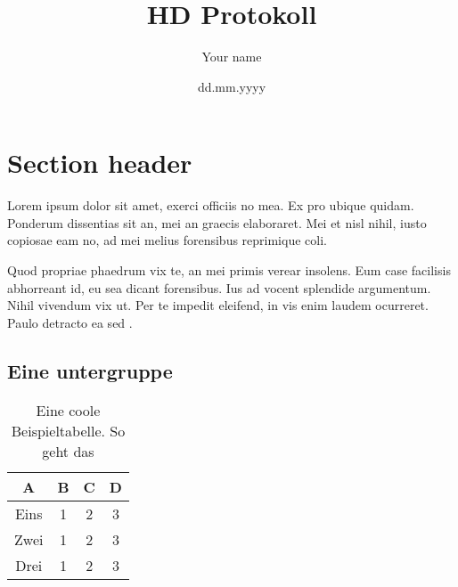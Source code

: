 \documentclass[%
 12pt,           %
 english,        %
 a4paper,        %
 DIV14,          %
 twoside,        %
 thesis,         %
 impberklaerung, %
]{hdprotokoll}
\title{HD Protokoll}
\author{Your name}
\date{dd.mm.yyyy}
\institute{free text}
\begin{document}
\maketitle                       %
\cleardoublepage                 %

\tableofcontents                 %

\newpage        			     %
\printglossaries                 %

\cleardoublepage                 %


\section{Section header}
Lorem ipsum dolor sit amet, exerci officiis no mea. Ex pro ubique quidam. Ponderum dissentias sit an, mei an graecis elaboraret. Mei et nisl nihil, iusto copiosae eam no, ad mei melius forensibus reprimique \gls{coli}.

Quod propriae phaedrum vix te, an mei primis verear insolens. Eum case facilisis abhorreant id, eu sea dicant forensibus. Ius ad vocent splendide argumentum. Nihil vivendum vix ut. Per te impedit eleifend, in vis enim laudem ocurreret. Paulo detracto ea sed \citep{hector1999plant}.

\subsection{Eine untergruppe}

\begin{table}
    \centering
    \caption{Eine coole Beispieltabelle. So geht das}
    \label{tab:example}
    \begin{tabular}{cccc} \toprule    
        \textbf{A} & \textbf{B} & \textbf{C} & \textbf{D}\\
        \midrule
        Eins &1 &2 &3 \\
        Zwei &1 &2 &3 \\
        Drei &1 &2 &3 \\
        \bottomrule
    \end{tabular} 
\end{table}
\end{document}
